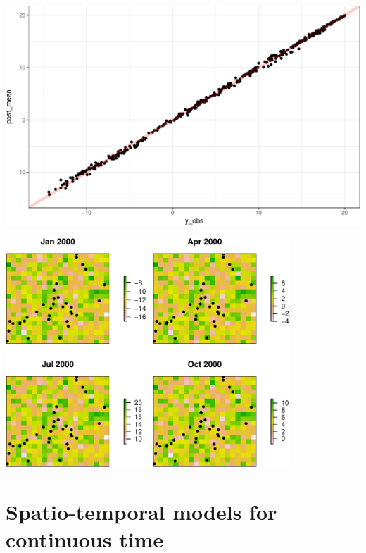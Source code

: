 \documentclass[11pt,ignorenonframetext,]{beamer}
\begin{document}
\begin{frame}{}

\includegraphics{Lec23_files/figure-beamer/unnamed-chunk-15-1.pdf}

\end{frame}

\begin{frame}{}

\begin{center}\includegraphics[width=0.8\textwidth]{Lec23_files/figure-beamer/unnamed-chunk-16-1} \end{center}

\end{frame}

\section{Spatio-temporal models for continuous
time}\label{spatio-temporal-models-for-continuous-time}
\end{document}
